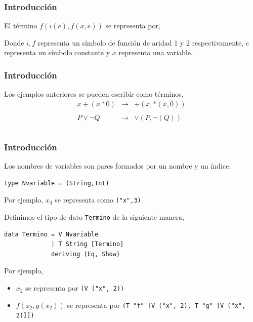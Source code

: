 \documentclass{beamer}
\begin{document}
\begin{frame}
  \frametitle{Introducción}
  \begin{block}{}
    El término $f(i(e), f(x,e))$ se representa por,
    \begin{figure}[h] \centering
    \end{figure}

    Donde $i,f$ representa un símbolo de función de aridad 1 y 2
    respectivamente, $e$ representa un símbolo constante y $x$
    representa una variable.
  \end{block}
\end{frame}

\begin{frame}
  \frametitle{Introducción}
  \begin{block}{}
    Los ejemplos anteriores se pueden escribir como términos,
    \[
      \begin{array}{rcl}
        x +(x*0) & \longrightarrow  & +(x,*(x,0)) \\ \\
        P \vee \neg Q & \longrightarrow & \vee(P, \neg(Q)) \\ \\
      \end{array} 
    \]
  \end{block}
\end{frame}

\begin{frame}[fragile]
  \frametitle{Introducción}

  Los nombres de variables son pares formados por un nombre y un
  índice.
  \begin{lstlisting}[frame=single]
type Nvariable = (String,Int)
  \end{lstlisting}

  Por ejemplo, $x_3$ se representa como \texttt{("x",3)}.

  Definimos el tipo de dato \texttt{Termino} de la siguiente manera,

  \begin{lstlisting}[frame=single]
data Termino = V Nvariable
             | T String [Termino]
             deriving (Eq, Show)
  \end{lstlisting}
  Por ejemplo,
  \begin{itemize}
  \item $x_2$ se representa por \texttt{(V ("x", 2))}
  \item $f(x_2,g(x_2))$ se representa por \texttt{(T "f" [V ("x", 2),
      T "g" [V ("x", 2)]])}
  \end{itemize}
\end{frame}
\end{document}
